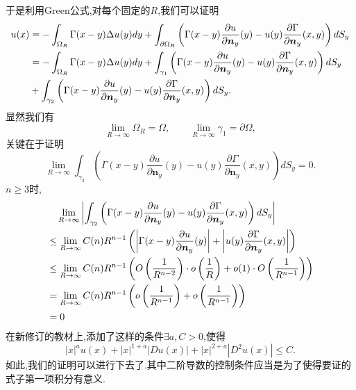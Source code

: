 \documentclass[12pt, a4paper]{article}
\begin{document}
	于是利用Green公式,对每个固定的$R$,我们可以证明
	\begin{align}
		u(x)&= -\int_{\Omega_R} \Gamma(x-y) \Delta u(y) dy + \int_{\partial \Omega_R} \left(\Gamma(x-y) \frac{\partial u}{\partial \bm{n}_y}(y) -u(y)\frac{\partial \Gamma}{\partial \bm{n}_y}(x,y)   \right) dS_y \notag \\
		&=-\int_{\Omega_R} \Gamma(x-y) \Delta u(y) dy + \int_{\gamma_1} \left(\Gamma(x-y) \frac{\partial u}{\partial \bm{n}_y}(y) -u(y)\frac{\partial \Gamma}{\partial \bm{n}_y}(x,y)   \right) dS_y \notag \\
		&+\int_{\gamma_2} \left(\Gamma(x-y) \frac{\partial u}{\partial \bm{n}_y}(y) -u(y)\frac{\partial \Gamma}{\partial \bm{n}_y}(x,y)   \right) dS_y. \notag
	\end{align}
	显然我们有$$
	\lim_{R \to \infty}	\Omega_R = \Omega ,\qquad \lim_{R \to \infty} \gamma_1 = \partial \Omega, $$
	关键在于证明$$
	\lim_{R \to \infty}\int_{\gamma_2} \left(\Gamma(x-y) \frac{\partial u}{\partial \bm{n}_y}(y) -u(y)\frac{\partial \Gamma}{\partial \bm{n}_y}(x,y)   \right) dS_y =0.	$$
	$n \ge 3$时,
	\begin{align}
		&\quad \lim_{R \to \infty} \left|\int_{\gamma_2} \left(\Gamma(x-y) \frac{\partial u}{\partial \bm{n}_y}(y) -u(y)\frac{\partial \Gamma}{\partial \bm{n}_y}(x,y)   \right) dS_y \right| \notag \\
		&\le \lim_{R \to \infty} C(n) R^{n-1} \left( \left| \Gamma(x-y) \frac{\partial u}{\partial \bm{n}_y}(y) \right|+\left|u(y)\frac{\partial \Gamma}{\partial \bm{n}_y}(x,y)   \right| \right) \notag \\
		&\le \lim_{R \to \infty} C(n) R^{n-1} \left( O\left(\frac{1}{R^{n-2}}\right) \cdot o\left(\frac{1}{R}\right) +o(1) \cdot O\left(\frac{1}{R^{n-1}}\right)   \right) \notag \\
		&= \lim_{R \to \infty} C(n) R^{n-1} \left(  o\left(\frac{1}{R^{n-1}}\right) + o\left(\frac{1}{R^{n-1}}\right) \right) \notag \\
		&= 0 \notag
	\end{align}
	{}
	在新修订的教材上,添加了这样的条件$\exists a,C >0$,使得$$
	|x|^a u(x)+|x|^{1+a} |Du(x)| + |x|^{2+a} |D^2 u(x)| \le C.	$$
	如此,我们的证明可以进行下去了.其中二阶导数的控制条件应当是为了使得要证的式子第一项积分有意义.
	
\end{document}
